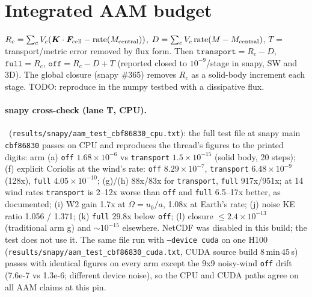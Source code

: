 \section{Integrated AAM budget}
$R_c=\sum_c V_c(\bm K\cdot\bm F_{\rm cell}-\mathrm{rate}(M_{\rm central}))$,
$D=\sum_c V_c\,\mathrm{rate}(M-M_{\rm central})$, $T$ = transport/metric error removed by flux form.
Then $\texttt{transport}=R_c-D$, $\texttt{full}=R_c$, $\texttt{off}=R_c-D+T$ (reported closed to $10^{-9}$/stage
in snapy, SW and 3D). The global closure (snapy \#365) removes $R_c$ as a solid-body increment each stage.
TODO: reproduce in the numpy testbed with a dissipative flux.

\paragraph{snapy cross-check (lane T, CPU).}\measured\ (\texttt{results/snapy/aam\_test\_cbf86830\_cpu.txt}): the
full test file at snapy main \texttt{cbf86830} passes on CPU and reproduces the thread's figures to the printed digits:
arm (a) \texttt{off} $1.68\times10^{-6}$ vs \texttt{transport} $1.5\times10^{-15}$ (solid body, 20 steps);
(f) explicit Coriolis at the wind's rate: \texttt{off} $8.29\times10^{-7}$, \texttt{transport} $6.48\times10^{-9}$ (128x),
\texttt{full} $4.05\times10^{-10}$; (g)/(h) 88x/83x for \texttt{transport}, \texttt{full} 917x/951x; at 14 wind rates
\texttt{transport} is 2--12x worse than \texttt{off} and \texttt{full} 6.5--17x better, as documented; (i) W2 gain 1.7x at
$\Omega=u_0/a$, 1.08x at Earth's rate; (j) noise KE ratio 1.056 / 1.371; (k) \texttt{full} 29.8x below \texttt{off};
(l) closure $\le 2.4\times10^{-13}$ (traditional arm g) and $\sim10^{-15}$ elsewhere. NetCDF was disabled in this build;
the test does not use it.
The same file run with \texttt{--device cuda} on one H100 (\texttt{results/snapy/aam\_test\_cbf86830\_cuda.txt}, CUDA source build
8\,min\,45\,s) passes with identical figures on every arm except the 9x9 noisy-wind \texttt{off} drift (7.6e-7 vs 1.3e-6; different
device noise), so the CPU and CUDA paths agree on all AAM claims at this pin.


